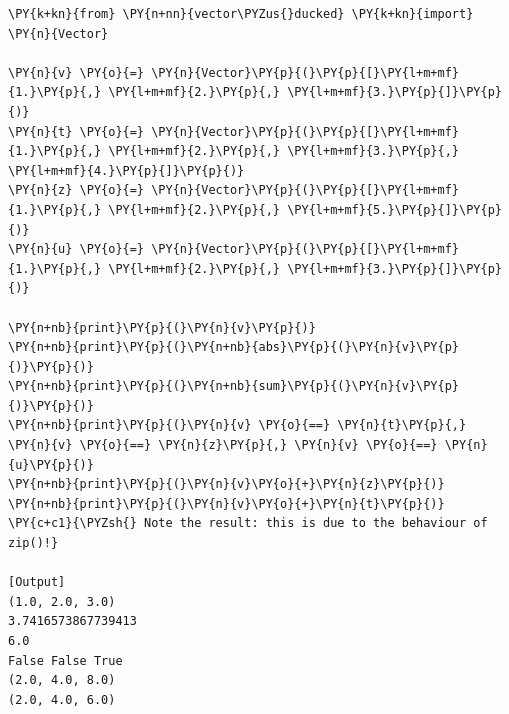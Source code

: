 \begin{Verbatim}[label=\makebox{\url{https://github.com/lucabaldini/cmepda/tree/master/slides/latex/snippets/test\_vector\_ducked.py}},commandchars=\\\{\}]
\PY{k+kn}{from} \PY{n+nn}{vector\PYZus{}ducked} \PY{k+kn}{import} \PY{n}{Vector}
       
\PY{n}{v} \PY{o}{=} \PY{n}{Vector}\PY{p}{(}\PY{p}{[}\PY{l+m+mf}{1.}\PY{p}{,} \PY{l+m+mf}{2.}\PY{p}{,} \PY{l+m+mf}{3.}\PY{p}{]}\PY{p}{)}
\PY{n}{t} \PY{o}{=} \PY{n}{Vector}\PY{p}{(}\PY{p}{[}\PY{l+m+mf}{1.}\PY{p}{,} \PY{l+m+mf}{2.}\PY{p}{,} \PY{l+m+mf}{3.}\PY{p}{,} \PY{l+m+mf}{4.}\PY{p}{]}\PY{p}{)}
\PY{n}{z} \PY{o}{=} \PY{n}{Vector}\PY{p}{(}\PY{p}{[}\PY{l+m+mf}{1.}\PY{p}{,} \PY{l+m+mf}{2.}\PY{p}{,} \PY{l+m+mf}{5.}\PY{p}{]}\PY{p}{)}
\PY{n}{u} \PY{o}{=} \PY{n}{Vector}\PY{p}{(}\PY{p}{[}\PY{l+m+mf}{1.}\PY{p}{,} \PY{l+m+mf}{2.}\PY{p}{,} \PY{l+m+mf}{3.}\PY{p}{]}\PY{p}{)}

\PY{n+nb}{print}\PY{p}{(}\PY{n}{v}\PY{p}{)}
\PY{n+nb}{print}\PY{p}{(}\PY{n+nb}{abs}\PY{p}{(}\PY{n}{v}\PY{p}{)}\PY{p}{)}
\PY{n+nb}{print}\PY{p}{(}\PY{n+nb}{sum}\PY{p}{(}\PY{n}{v}\PY{p}{)}\PY{p}{)}
\PY{n+nb}{print}\PY{p}{(}\PY{n}{v} \PY{o}{==} \PY{n}{t}\PY{p}{,} \PY{n}{v} \PY{o}{==} \PY{n}{z}\PY{p}{,} \PY{n}{v} \PY{o}{==} \PY{n}{u}\PY{p}{)}
\PY{n+nb}{print}\PY{p}{(}\PY{n}{v}\PY{o}{+}\PY{n}{z}\PY{p}{)}
\PY{n+nb}{print}\PY{p}{(}\PY{n}{v}\PY{o}{+}\PY{n}{t}\PY{p}{)} \PY{c+c1}{\PYZsh{} Note the result: this is due to the behaviour of zip()!}

[Output]
(1.0, 2.0, 3.0)
3.7416573867739413
6.0
False False True
(2.0, 4.0, 8.0)
(2.0, 4.0, 6.0)
\end{Verbatim}